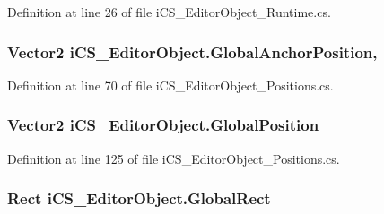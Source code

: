 Definition at line 26 of file i\+C\+S\+\_\+\+Editor\+Object\+\_\+\+Runtime.\+cs.

\hypertarget{classi_c_s___editor_object_a54adb6048e897120ee854c684e99a3ad}{
\subsubsection[{Global\+Anchor\+Position}]{\setlength{\rightskip}{0pt plus 5cm}Vector2 i\+C\+S\+\_\+\+Editor\+Object.\+Global\+Anchor\+Position\hspace{0.3cm}{\ttfamily [get]}, {\ttfamily [set]}}}\label{classi_c_s___editor_object_a54adb6048e897120ee854c684e99a3ad}


Definition at line 70 of file i\+C\+S\+\_\+\+Editor\+Object\+\_\+\+Positions.\+cs.

\hypertarget{classi_c_s___editor_object_a357ff623b50ca4e5a2bd5367e0d93ee4}{
\subsubsection[{Global\+Position}]{\setlength{\rightskip}{0pt plus 5cm}Vector2 i\+C\+S\+\_\+\+Editor\+Object.\+Global\+Position\hspace{0.3cm}{\ttfamily [get]}}}\label{classi_c_s___editor_object_a357ff623b50ca4e5a2bd5367e0d93ee4}


Definition at line 125 of file i\+C\+S\+\_\+\+Editor\+Object\+\_\+\+Positions.\+cs.

\hypertarget{classi_c_s___editor_object_a0e49cd1cc74e53408eaf403758a891bb}{
\subsubsection[{Global\+Rect}]{\setlength{\rightskip}{0pt plus 5cm}Rect i\+C\+S\+\_\+\+Editor\+Object.\+Global\+Rect\hspace{0.3cm}{\ttfamily [get]}}}\label{classi_c_s___editor_object_a0e49cd1cc74e53408eaf403758a891bb}


